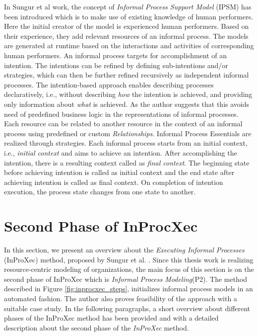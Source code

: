 In Sungur et al \cite{Sungur2014a} work, the concept of \textit{Informal Process Support Model} (IPSM) has been introduced which is to make use of existing knowledge of human performers. Here the initial creator of the model is experienced human performers. Based on their experience, they add relevant  resources of an informal process. The models are generated at runtime based on the interactions and activities of corresponding human performers. An informal process targets for accomplishment of an intention. The intentions can be refined by defining sub-intentions and/or strategies, which can then be further refined recursively as independent informal processes. The intention-based approach enables describing processes declaratively, i.e., without describing \textit{how} the intention is achieved, and providing only information about \textit{what} is achieved. As the author \cite{Sungur2014a} suggests that this avoids need of predefined business logic in the representations of informal processes. Each resource can be related to another resource in the context of an informal process using predefined or custom \textit{Relationships}. Informal Process Essentials are realized through strategies. Each informal process starts from an initial context, i.e., \textit{initial context} and aims to achieve an intention. After accomplishing the intention, there is a resulting context called as \textit{final context}. The beginning state before achieving intention is called as initial context and the end state after achieving intention is called as final context. On completion of intention execution, the process state changes from one state to another.

\section{Second Phase of InProcXec}
\label{sec:inproxec}
In this section, we present an overview about the \textit{Executing Informal Processes} (InProXec) method, proposed by Sungur et al. \cite{Sungur2015}. Since this thesis work is realizing resource-centric modeling of organizations, the main focus of this section is on the second phase of InProXec which is \textit{Informal Process Modeling}(P2). The method described in Figure \ref{fig:inprocxec_steps}, initializes informal process models in an automated fashion. The author also proves feasibility of the approach with a suitable case study.  In the following paragraphs, a short overview about different phases of the InProXec method has been provided and with a detailed description about the second phase of the \textit{InProXec} method. 

